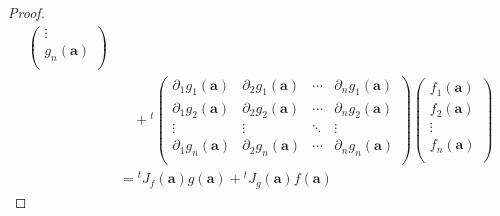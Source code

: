 \documentclass[dvipdfmx]{jsarticle}
\begin{document}
\begin{proof}
\begin{align*}
\begin{pmatrix}
 \vdots \\
g_{n}\left( \mathbf{a} \right) \\
\end{pmatrix} \\
&\quad +{}^{t}\begin{pmatrix}
\partial_{1}g_{1}\left( \mathbf{a} \right) & \partial_{2}g_{1}\left( \mathbf{a} \right) & \cdots & \partial_{n}g_{1}\left( \mathbf{a} \right) \\
\partial_{1}g_{2}\left( \mathbf{a} \right) & \partial_{2}g_{2}\left( \mathbf{a} \right) & \cdots & \partial_{n}g_{2}\left( \mathbf{a} \right) \\
 \vdots & \vdots & \ddots & \vdots \\
\partial_{1}g_{n}\left( \mathbf{a} \right) & \partial_{2}g_{n}\left( \mathbf{a} \right) & \cdots & \partial_{n}g_{n}\left( \mathbf{a} \right) \\
\end{pmatrix}\begin{pmatrix}
f_{1}\left( \mathbf{a} \right) \\
f_{2}\left( \mathbf{a} \right) \\
 \vdots \\
f_{n}\left( \mathbf{a} \right) \\
\end{pmatrix}\\
&={}^{t}J_{f}\left( \mathbf{a} \right)g\left( \mathbf{a} \right) +{}^{t}J_{g}\left( \mathbf{a} \right)f\left( \mathbf{a} \right)
\end{align*}
\end{proof}
\end{document}
